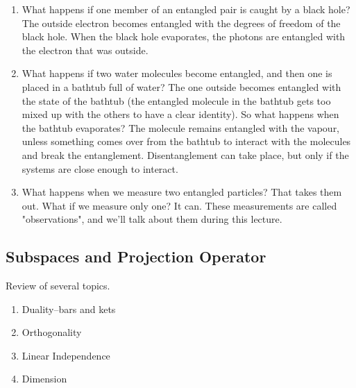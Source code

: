 \documentclass[]{article}
\begin{document}
\begin{enumerate}
	\item What happens if one member of an entangled pair is caught by a black hole? The outside electron becomes entangled with the degrees of freedom of the black hole. When the black hole evaporates, the photons are entangled with the electron that was outside.
	\item What happens if two water molecules become entangled, and then one is placed in a bathtub full of water? The one outside becomes entangled with the state of the bathtub (the entangled molecule in the bathtub gets too mixed up with the others to have a clear identity). So what happens when the bathtub evaporates? The molecule remains entangled with the vapour, unless something comes over from the bathtub to interact with the molecules and break the entanglement. Disentanglement can take place, but only if the systems are close enough to interact.
	\item What happens when we measure two entangled particles? That takes them out. What if we measure only one? It can. These measurements are called "observations", and we'll talk about them during this lecture.
\end{enumerate}

\subsection{Subspaces and Projection Operator}

Review of several topics.
\begin{enumerate}
	\item Duality--bars and kets
	\item Orthogonality
	\item Linear Independence
	\item Dimension
\end{enumerate}
\end{document}
